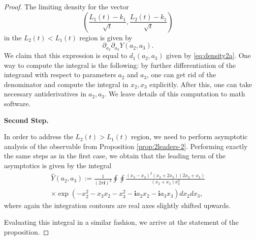 \documentclass[10pt,a4paper]{amsart}
\newcommand{\ii}{{\mathbf i}}
\begin{document}
\begin{proof}
		The limiting density for the vector 
		$$
		\left( \frac{L_1(t) - k_1}{\sqrt{t}}, \frac{L_2(t) - k_1}{\sqrt{t}} \right)
		$$
		in the $L_2 (t) < L_1(t)$ region is given by
		$$
		\partial_{a_2} \partial_{a_3} Y(a_2,a_3).
		$$
		We claim that this expression is equal to $d_1(a_2,a_3)$ given by \eqref{eq:density2a}. One way to compute the integral is the following: by further differentiation of the integrand with respect to parameters $a_2$ and $a_3$, one can get rid of the denominator and compute the integral in $x_2, x_3$ explicitly. After this, one can take necessary antiderivatives in $a_2, a_3$. We leave details of this computation to math software.
		
		\smallskip
		
		\textbf{Second Step.}
		
		\smallskip
		
		In order to address the $L_2 (t) > L_1(t)$ region, we need to perform asymptotic analysis of the observable from Proposition \ref{prop:2leaders-2}. Performing exactly the same steps as in the first case, we obtain that the leading term of the asymptotics is given by the integral
		\begin{multline*}
			\hat Y (a_2,a_3) := \frac{1}{(2 \pi \ii)^2} \oint \oint \frac{(x_3-x_2)^2 (x_2 + 2 x_3)(2 x_2 + x_3)}{ (x_2 + x_3) x_3^3 } \\ \times \exp \left( - x_2^2 - x_3 x_2 - x_3^2 - \ii a_2 x_2 - \ii a_3 x_3 \right) d x_2 d x_3,
		\end{multline*}
		where again the integration contours are real axes slightly shifted upwards. 
		
		Evaluating this integral in a similar fashion, we arrive at the statement of the proposition. 
		
	\end{proof}
\end{document}
